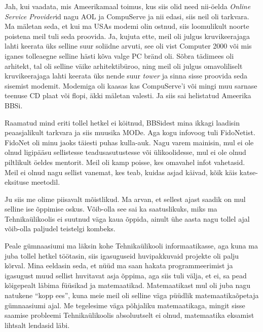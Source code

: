 Jah, kui vaadata, mis Ameerikamaal toimus, kus siis olid need nii-öelda 
\emph{Online Service Provider}id  nagu AOL ja 
CompuServe ja nii edasi, siis neil oli tarkvara. Ma mäletan seda, et 
kui ma USAs modemi  olin ostnud, siis loomulikult noorte poistena meil tuli 
seda proovida. Ja, kujuta ette, meil oli julgus kruvikeerajaga lahti keerata 
üks selline suur soliidne arvuti, see oli vist Computer 2000 või mis iganes 
tolleaegne  selline hästi kõva valge PC bränd oli. Sõbra tädimees oli 
arhitekt, tal oli selline väike arhitektibüroo, ning meil oli julgus  
omavoliliselt kruvikeerajaga  lahti keerata üks nende suur \emph{tower} ja 
sinna sisse proovida seda sisemist modemit. Modemiga oli kaasas kas 
CompuServe'i või mingi muu sarnase teenuse CD plaat või flopi, äkki mäletan 
valesti. Ja siis sai helistatud Ameerika BBSi.  


Raamatud mind eriti  tollel hetkel ei köitnud, BBSidest mina ikkagi laadisin 
peaasjalikult tarkvara ja siis muusika MODe. Aga kogu infovoog 
tuli FidoNetist. FidoNet oli minu jaoks täiesti puhas kulla-auk. Nagu varem 
mainisin,  mul ei ole olnud ligipääsu sellistesse teadusasutustesse või 
ülikoolidesse,  mul ei ole olnud piltlikult öeldes mentorit. Meil oli kamp 
poisse, kes omavahel  infot vahetasid. Meil ei olnud nagu sellist vanemat, kes 
teab, kuidas asjad käivad,  kõik käis katse-eksituse meetodil.


Ju siis me olime piisavalt mõistlikud. Ma arvan, et sellest ajast saadik on mul 
selline ise õppimise  oskus. Võib-olla see sai ka saatuslikuks, miks ma 
Tehnikaülikoolis ei suutnud väga kaua õppida,  ainult ühe aasta nagu tollel 
ajal võib-olla paljudel teistelgi kombeks.

Peale gümnaasiumi ma läksin kohe Tehnikaülikooli informaatikasse, aga kuna ma juba tollel hetkel töötasin, siis 
igasuguseid huvipakkuvaid projekte oli  palju kõrval. Mina eeldasin seda, et 
nüüd ma saan hakata programmeerimist ja igasugust muud sellist huvitavat asja 
õppima, aga siis tuli välja, et ei,  sa pead kõigepealt läbima füüsikad ja 
matemaatikad. Matemaatikast mul oli juba nagu natukene \enquote{kopp ees}, kuna 
meie meil oli selline väga püüdlik matemaatikaõpetaja gümnaasiumi ajal. Me 
tegelesime väga põhjaliku matemaatikaga, mingit sisse saamise probleemi 
Tehnikaülikoolis  absoluutselt ei olnud,  matemaatika eksamist lihtsalt 
lendasid läbi.

